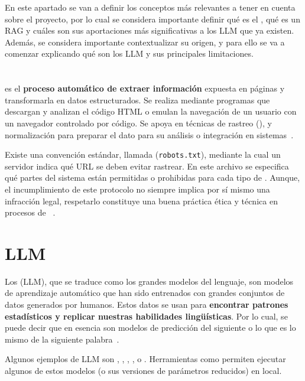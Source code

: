 
En este apartado se van a definir los conceptos más relevantes a tener en cuenta sobre el proyecto, por lo cual se considera importante definir qué es el , qué es un RAG y cuáles son sus aportaciones más significativas a los LLM que ya existen. Además, se considera importante contextualizar su origen, y para ello se va a comenzar explicando qué son los LLM y sus principales limitaciones.

\section{}
 es el \textbf{proceso automático de extraer información} expuesta en páginas  y transformarla en datos estructurados. Se realiza mediante programas que descargan y analizan el código HTML o emulan la navegación de un usuario con un navegador controlado por código. Se apoya en técnicas de rastreo (),  y normalización para preparar el dato para su análisis o integración en sistemas~\cite{webScraping}.

Existe una convención estándar, llamada  (\texttt{robots.txt}), mediante la cual un servidor  indica qué URL se deben evitar rastrear. En este archivo se especifica qué partes del sistema están permitidas o prohibidas para cada tipo de . Aunque, el incumplimiento de este protocolo no siempre implica por sí mismo una infracción legal, respetarlo constituye una buena práctica ética y técnica en procesos de ~\cite{rfc9309}. 

\section{LLM}
Los  (LLM), que se traduce como los grandes modelos del lenguaje, son modelos de aprendizaje automático que han sido entrenados con grandes conjuntos de datos generados por humanos. Estos datos se usan para \textbf{encontrar patrones estadísticos y replicar nuestras habilidades lingüísticas}. Por lo cual, se puede decir que en esencia son modelos de predicción del siguiente  o lo que es lo mismo de la siguiente palabra~\cite{book:RAG_SimpleGuide}.

Algunos ejemplos de LLM son , , , ,  o . Herramientas como  permiten ejecutar algunos de estos modelos (o sus versiones de parámetros reducidos) en local.

